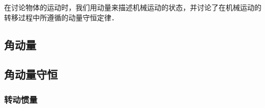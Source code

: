 
\begin{issues}
\issueTODO
\end{issues}

在讨论物体的运动时，我们用动量来描述机械运动的状态，并讨论了在机械运动的转移过程中所遵循的动量守恒定律．
\subsection{角动量}

\subsection{角动量守恒}

\subsubsection{转动惯量}



